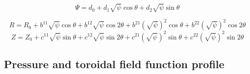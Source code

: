 \documentclass{article}
\begin{document}
\[ \Psi = d_0 + d_1 \sqrt{\psi} \cos \theta + d_2 \sqrt{\psi} \sin \theta \]

\begin{equation}
  R = R_0 + b^{11} \sqrt{\psi} \cos \theta + b^{12} \sqrt{\psi} \cos 2 \theta
  + b^{21} \left( \sqrt{\psi} \right)^2 \cos \theta + b^{22} \left(
  \sqrt{\psi} \right)^2 \cos 2 \theta
\end{equation}
\begin{equation}
  Z = Z_0 + c^{11} \sqrt{\psi} \sin \theta + c^{12} \sqrt{\psi} \sin 2 \theta
  + c^{21} \left( \sqrt{\psi} \right)^2 \sin \theta + c^{22} \left(
  \sqrt{\psi} \right)^2 \sin 2 \theta
\end{equation}

\subsection{Pressure and toroidal field function profile}
\end{document}
